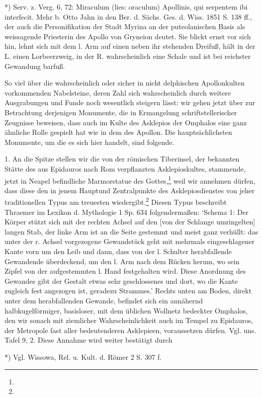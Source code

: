 \documentclass[a4paper, 11pt, oneside]{article}
\begin{document}
*) Serv. z. Verg. 6, 72: Miraculum (lies: oraculum) Apollinis, qui serpentem ibi interfecit. Mehr b. Otto Jahn in den Ber. d. Sächs. Ges. d. Wiss. 1851 S. 138 ff., der auch die Personifikation der Stadt Myrina an der puteolanischen Basis als weissagende Priesterin des Apollo von Gryneion deutet. Sie blickt ernst vor sich hin, lehnt sich mit dem l. Arm auf einen neben ihr stehenden Dreifuß, hält in der L. einen Lorbeerzweig, in der R. wahrscheinlich eine Schale und ist bei reichster Gewandung barfuß.

So viel über die wahrscheinlich oder sicher in nicht delphischen Apollonkulten vorkommenden Nabelsteine, deren Zahl sich wahrscheinlich durch weitere Ausgrabungen und Funde noch wesentlich steigern lässt: wir gehen jetzt über zur Betrachtung derjenigen Monumente, die in Ermangelung schriftstellerischer Zeugnisse beweisen, dass auch im Kulte des Asklepios der Omphalos eine ganz ähnliche Rolle gespielt hat wie in dem des Apollon. Die hauptsächlichsten Monumente, um die es sich hier handelt, sind folgende.

1. An die Spitze stellen wir die von der römischen Tiberinsel, der bekannten Stätte des aus Epidauros nach Rom verpflanzten Asklepioskultes, stammende, jetzt in Neapel befindliche Marmorstatue des Gottes,\footnote{} weil wir annehmen dürfen, dass diese den in jenem Hauptund Zentralpunkte des Asklepiosdienstes von jeher traditionellen Typus am treuesten wiedergibt.\footnote{} Diesen Typus beschreibt Thraemer im Lexikon d. Mythologie 1 Sp. 634 folgendermaßen: `Schema 1: Der Körper stützt sich mit der rechten Achsel auf den [von der Schlange umringelten] langen Stab, der linke Arm ist an die Seite gestemmt und meist ganz verhüllt: das unter der r. Achsel vorgezogene Gewandstück geht mit mehrmals eingeschlagener Kante vorn um den Leib und dann, dass von der l. Schulter herabfallende Gewandende überdeckend, um den l. Arm nach dem Rücken herum, wo sein Zipfel von der aufgestemmten l. Hand festgehalten wird. Diese Anordnung des Gewandes gibt der Gestalt etwas sehr geschlossenes und dort, wo die Kante zugleich fest angezogen ist, geradezu Strammes.' Rechts unten am Boden, direkt unter dem herabfallenden Gewande, befindet sich ein annähernd halbkugelförmiger, basisloser, mit dem üblichen Wollnetz bedeckter Omphalos, den wir sonach mit ziemlicher Wahrscheinlichkeit auch im Tempel zu Epidauros, der Metropole fast aller bedeutenderen Asklepieen, voraussetzen dürfen. Vgl. uns. Tafel 9, 2. Diese Annahme wird weiter bestätigt durch

*) Vgl. Wissowa, Rel. u. Kult. d. Römer 2 S. 307 f.
\end{document}
